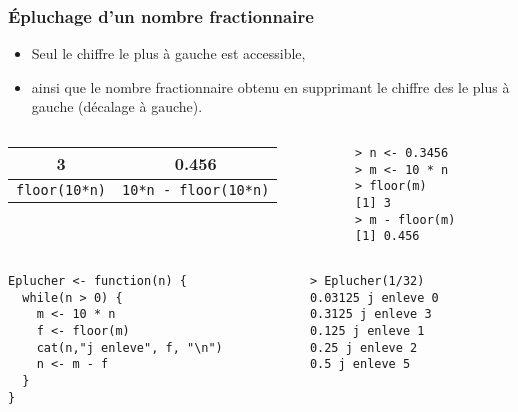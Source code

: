 \documentclass[10pt]{beamer}
\begin{document}
\begin{frame}[fragile]
  \frametitle{Épluchage d'un nombre fractionnaire}
  \begin{itemize}
  \item Seul le chiffre le plus à gauche est accessible, 
  \item ainsi que le nombre fractionnaire obtenu en supprimant le chiffre des le plus à gauche (décalage à gauche).
  \end{itemize}
 
  \begin{columns}[c]
    \begin{column}{0.6\textwidth}
      \begin{center}
  \begin{tabular}{c|c}
    \toprule
    3                    & 0.456                         \\
    \midrule
    \texttt{floor(10*n)} & \texttt{10*n - floor(10*n)} \\
    \bottomrule
  \end{tabular}
\end{center}  
\end{column}
\begin{column}{0.4\textwidth}
  \begin{lstlisting}
> n <- 0.3456
> m <- 10 * n
> floor(m)
[1] 3
> m - floor(m)
[1] 0.456
\end{lstlisting}
\end{column}
\end{columns}



\begin{columns}[t]
\begin{column}{0.6\textwidth}
\begin{lstlisting}[style=editor]
Eplucher <- function(n) {
  while(n > 0) {
    m <- 10 * n
    f <- floor(m)
    cat(n,"j enleve", f, "\n")
    n <- m - f
  }
}  
\end{lstlisting}
\end{column}
\begin{column}{0.4\textwidth}
\begin{lstlisting}
> Eplucher(1/32)
0.03125 j enleve 0 
0.3125 j enleve 3 
0.125 j enleve 1 
0.25 j enleve 2 
0.5 j enleve 5 
\end{lstlisting}
\end{column}
\end{columns}

\end{frame}
\end{document}
